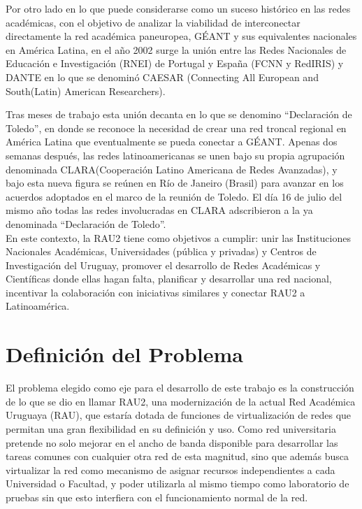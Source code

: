 Por otro lado en lo que puede considerarse como un suceso histórico en las redes académicas, 
con el objetivo de analizar la viabilidad de interconectar directamente la red académica paneuropea, GÉANT y sus equivalentes nacionales en América Latina, en el año 2002 surge la unión entre las Redes Nacionales de Educación e Investigación (RNEI) de Portugal y España (FCNN y RedIRIS) y DANTE en lo que se denominó CAESAR (Connecting All European and South(Latin) American Researchers). 

Tras meses de trabajo esta unión decanta en lo que se denomino “Declaración de Toledo”, en donde se reconoce la necesidad de crear una red troncal regional en América Latina que eventualmente se pueda conectar a GÉANT. Apenas dos semanas después, las redes latinoamericanas se unen bajo su propia agrupación denominada CLARA(Cooperación Latino Americana de Redes Avanzadas), y bajo esta nueva figura se reúnen en Río de Janeiro (Brasil) para avanzar en los acuerdos adoptados en el marco de la reunión de Toledo. El día 16 de julio del mismo año todas las redes involucradas en CLARA adscribieron a la ya denominada “Declaración de Toledo”.\\

En este contexto, la RAU2 tiene como objetivos a cumplir: unir las Instituciones Nacionales Académicas, Universidades (pública y privadas) y Centros de Investigación del Uruguay, promover el desarrollo de Redes Académicas y Científicas donde ellas hagan falta, planificar y desarrollar una red nacional, incentivar la colaboración con iniciativas similares y conectar RAU2 a Latinoamérica. 

\section{Definición del Problema}

El problema elegido como eje para el desarrollo de este trabajo es la 
construcción de lo que se dio en llamar RAU2, una modernización de la actual Red Académica Uruguaya (RAU), que estaría dotada de funciones de virtualización de redes que permitan una gran flexibilidad en su definición y uso. Como red universitaria pretende no solo mejorar en el ancho de banda disponible para desarrollar las tareas comunes con cualquier otra red de esta magnitud, sino que además busca virtualizar la red como mecanismo de asignar recursos independientes a cada Universidad o Facultad, y poder utilizarla al mismo tiempo como laboratorio de pruebas sin que esto interfiera con el funcionamiento normal de la red.\\


